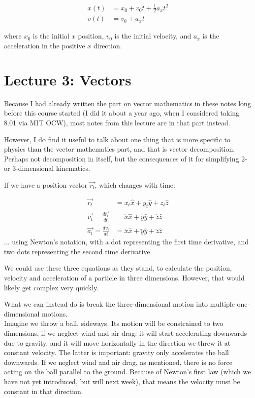\begin{align}
x(t) &= x_0 + v_0 t + \frac{1}{2} a_x t^2\\
v(t) &= v_0 + a_x t
\end{align}

where $x_0$ is the initial $x$ position, $v_0$ is the initial velocity, and $a_x$ is the acceleration in the positive $x$ direction.


\section{Lecture 3: Vectors}

Because I had already written the part on vector mathematics in these notes long before this course started (I did it about a year ago, when I considered taking 8.01 via MIT OCW), most notes from this lecture are in that part instead.

However, I do find it useful to talk about one thing that is more specific to physics than the vector mathematics part, and that is vector decomposition. Perhaps not decomposition in itself, but the consequences of it for simplifying 2- or 3-dimensional kinematics.

If we have a position vector $\vec{r_t}$, which changes with time:

\begin{align}
 \vec{r_t} &= x_t \hat{x} + y_t \hat{y} + z_t \hat{z} \\
 \vec{v_t} = \frac{d\vec{r_t}}{dt} &= \dot{x} \hat{x} + \dot{y} \hat{y} + \dot{z} \hat{z}\\
 \vec{a_t} = \frac{d\vec{v_t}}{dt} &= \ddot{x} \hat{x} + \ddot{y} \hat{y} + \ddot{z} \hat{z}
\end{align}
... using Newton's notation, with a dot representing the first time derivative, and two dots representing the second time derivative.

We could use these three equations as they stand, to calculate the position, velocity and acceleration of a particle in three dimensions. However, that would likely get complex very quickly.

What we can instead do is break the three-dimensional motion into multiple one-dimensional motions.\\
Imagine we throw a ball, sideways. Its motion will be constrained to two dimensions, if we neglect wind and air drag: it will start accelerating downwards due to gravity, and it will move horizontally in the direction we threw it at constant velocity. The latter is important: gravity only accelerates the ball downwards. If we neglect wind and air drag, as mentioned, there is no force acting on the ball parallel to the ground. Because of Newton's first law (which we have not yet introduced, but will next week), that means the velocity must be constant in that direction.

